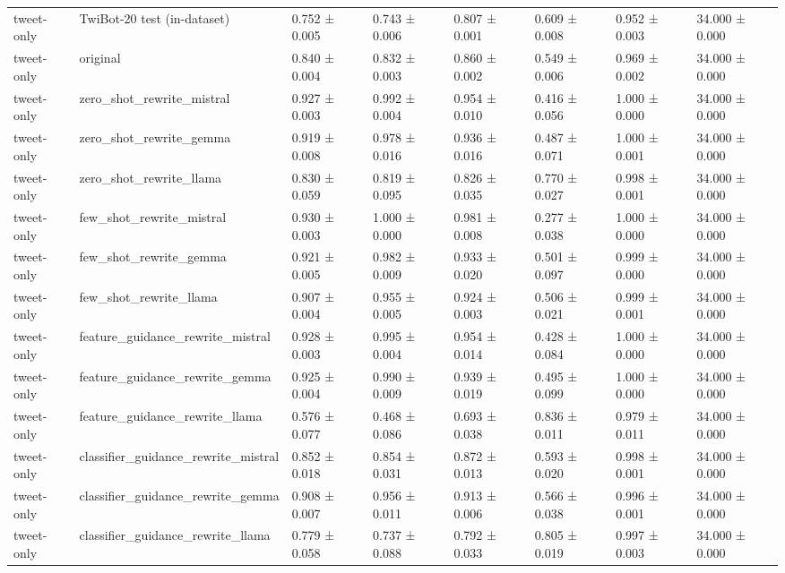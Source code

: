 \begin{tabular}{llllllll}
tweet-only & TwiBot-20 test (in-dataset) & 0.752 ± 0.005 & 0.743 ± 0.006 & 0.807 ± 0.001 & 0.609 ± 0.008 & 0.952 ± 0.003 & 34.000 ± 0.000 \\
tweet-only & original & 0.840 ± 0.004 & 0.832 ± 0.003 & 0.860 ± 0.002 & 0.549 ± 0.006 & 0.969 ± 0.002 & 34.000 ± 0.000 \\
tweet-only & zero_shot_rewrite_mistral & 0.927 ± 0.003 & 0.992 ± 0.004 & 0.954 ± 0.010 & 0.416 ± 0.056 & 1.000 ± 0.000 & 34.000 ± 0.000 \\
tweet-only & zero_shot_rewrite_gemma & 0.919 ± 0.008 & 0.978 ± 0.016 & 0.936 ± 0.016 & 0.487 ± 0.071 & 1.000 ± 0.001 & 34.000 ± 0.000 \\
tweet-only & zero_shot_rewrite_llama & 0.830 ± 0.059 & 0.819 ± 0.095 & 0.826 ± 0.035 & 0.770 ± 0.027 & 0.998 ± 0.001 & 34.000 ± 0.000 \\
tweet-only & few_shot_rewrite_mistral & 0.930 ± 0.003 & 1.000 ± 0.000 & 0.981 ± 0.008 & 0.277 ± 0.038 & 1.000 ± 0.000 & 34.000 ± 0.000 \\
tweet-only & few_shot_rewrite_gemma & 0.921 ± 0.005 & 0.982 ± 0.009 & 0.933 ± 0.020 & 0.501 ± 0.097 & 0.999 ± 0.000 & 34.000 ± 0.000 \\
tweet-only & few_shot_rewrite_llama & 0.907 ± 0.004 & 0.955 ± 0.005 & 0.924 ± 0.003 & 0.506 ± 0.021 & 0.999 ± 0.001 & 34.000 ± 0.000 \\
tweet-only & feature_guidance_rewrite_mistral & 0.928 ± 0.003 & 0.995 ± 0.004 & 0.954 ± 0.014 & 0.428 ± 0.084 & 1.000 ± 0.000 & 34.000 ± 0.000 \\
tweet-only & feature_guidance_rewrite_gemma & 0.925 ± 0.004 & 0.990 ± 0.009 & 0.939 ± 0.019 & 0.495 ± 0.099 & 1.000 ± 0.000 & 34.000 ± 0.000 \\
tweet-only & feature_guidance_rewrite_llama & 0.576 ± 0.077 & 0.468 ± 0.086 & 0.693 ± 0.038 & 0.836 ± 0.011 & 0.979 ± 0.011 & 34.000 ± 0.000 \\
tweet-only & classifier_guidance_rewrite_mistral & 0.852 ± 0.018 & 0.854 ± 0.031 & 0.872 ± 0.013 & 0.593 ± 0.020 & 0.998 ± 0.001 & 34.000 ± 0.000 \\
tweet-only & classifier_guidance_rewrite_gemma & 0.908 ± 0.007 & 0.956 ± 0.011 & 0.913 ± 0.006 & 0.566 ± 0.038 & 0.996 ± 0.001 & 34.000 ± 0.000 \\
tweet-only & classifier_guidance_rewrite_llama & 0.779 ± 0.058 & 0.737 ± 0.088 & 0.792 ± 0.033 & 0.805 ± 0.019 & 0.997 ± 0.003 & 34.000 ± 0.000 \\
\bottomrule
\end{tabular}
